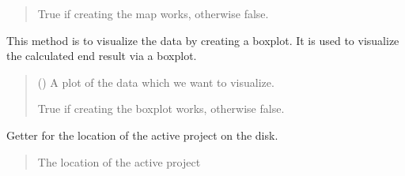 \documentclass[letterpaper,10pt,english]{sphinxmanual}
\begin{document}
\begin{fulllineitems}
\begin{fulllineitems}
\begin{quote}
\begin{description}
\sphinxAtStartPar
True if creating the map works, otherwise false.

\sphinxAtStartPar
{}

\end{description}\end{quote}

\end{fulllineitems}


\begin{fulllineitems}
\label{\detokenize{apidoc/src.osm_configurator.model.application:src.osm_configurator.model.application.application.Application.create_boxplot}}
\pysigstartsignatures
{}
\pysigstopsignatures
\sphinxAtStartPar
This method is to visualize the data by creating a boxplot.
It is used to visualize the calculated end result via a boxplot.
\begin{quote}\begin{description}
\sphinxAtStartPar
{} () \textendash{} A plot of the data which we want to visualize.

\sphinxAtStartPar
True if creating the boxplot works, otherwise false.

\sphinxAtStartPar
{}

\end{description}\end{quote}

\end{fulllineitems}


\begin{fulllineitems}
\label{\detokenize{apidoc/src.osm_configurator.model.application:src.osm_configurator.model.application.application.Application.get_location}}
\pysigstartsignatures
{}
\pysigstopsignatures
\sphinxAtStartPar
Getter for the location of the active project on the disk.
\begin{quote}\begin{description}
\sphinxAtStartPar
The location of the active project


\end{description}
\end{quote}
\end{fulllineitems}
\end{fulllineitems}
\end{document}
